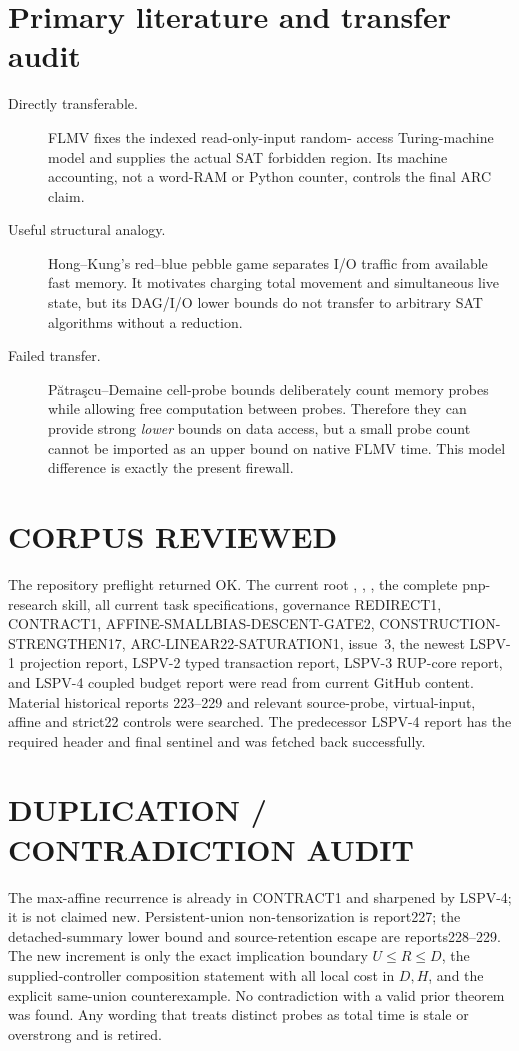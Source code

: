 \documentclass[11pt]{article}
\begin{document}
\section{Primary literature and transfer audit}
\begin{description}
\item[Directly transferable.] FLMV fixes the indexed read-only-input random-
access Turing-machine model and supplies the actual SAT forbidden region.  Its
machine accounting, not a word-RAM or Python counter, controls the final ARC
claim.
\item[Useful structural analogy.] Hong--Kung's red--blue pebble game separates
I/O traffic from available fast memory.  It motivates charging total movement
and simultaneous live state, but its DAG/I/O lower bounds do not transfer to
arbitrary SAT algorithms without a reduction.
\item[Failed transfer.] P\u{a}tra\c{s}cu--Demaine cell-probe bounds deliberately
count memory probes while allowing free computation between probes.  Therefore
they can provide strong \emph{lower} bounds on data access, but a small probe
count cannot be imported as an upper bound on native FLMV time.  This model
difference is exactly the present firewall.
\end{description}

\section{CORPUS REVIEWED}
The repository preflight returned OK.  The current root ,
, , the complete pnp-research skill, all current
task specifications, governance REDIRECT1, CONTRACT1,
AFFINE-SMALLBIAS-DESCENT-GATE2, CONSTRUCTION-STRENGTHEN17,
ARC-LINEAR22-SATURATION1, issue~3, the newest LSPV-1 projection report,
LSPV-2 typed transaction report, LSPV-3 RUP-core report, and LSPV-4 coupled
budget report were read from current GitHub content.  Material historical
reports 223--229 and relevant source-probe, virtual-input, affine and strict22
controls were searched.  The predecessor LSPV-4 report has the required header
and final sentinel and was fetched back successfully.

\section{DUPLICATION / CONTRADICTION AUDIT}
The max-affine recurrence is already in CONTRACT1 and sharpened by LSPV-4; it
is not claimed new.  Persistent-union non-tensorization is report227; the
detached-summary lower bound and source-retention escape are reports228--229.
The new increment is only the exact implication boundary
\(U\le R\le D\), the supplied-controller composition statement with all local
cost in $D,H$, and the explicit same-union counterexample.  No contradiction
with a valid prior theorem was found.  Any wording that treats distinct probes
as total time is stale or overstrong and is retired.
\end{document}
